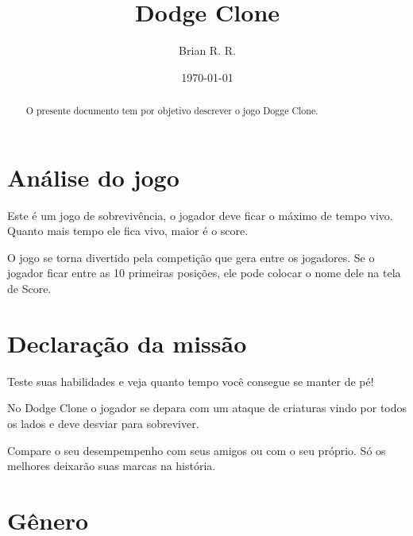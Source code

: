 \documentclass[12pt,a4paper]{article}
\title{Dodge Clone}
\author{Brian R. R.}
\date{\today}
\begin{document}
\begin{titlepage}
\maketitle
\end{titlepage}

\begin{abstract}
O presente documento tem por objetivo descrever o jogo Dogge Clone.
\end{abstract}

\tableofcontents{}

\section{Análise do jogo}


Este é um jogo de sobrevivência, o jogador deve ficar o máximo de tempo vivo.
Quanto mais tempo ele fica vivo, maior é o score.

O jogo se torna divertido pela competição que gera entre os jogadores.
Se o jogador ficar entre as 10 primeiras posições, ele pode colocar o nome dele
na tela de Score.

\section{Declaração da missão}


Teste suas habilidades e veja quanto tempo você consegue se manter de pé!

No Dodge Clone o jogador se depara com um ataque de criaturas vindo por todos
os lados e deve desviar para sobreviver.

Compare o seu desempempenho com seus amigos ou com o seu próprio. Só os
melhores deixarão suas marcas na história.

\section{Gênero}
\end{document}
